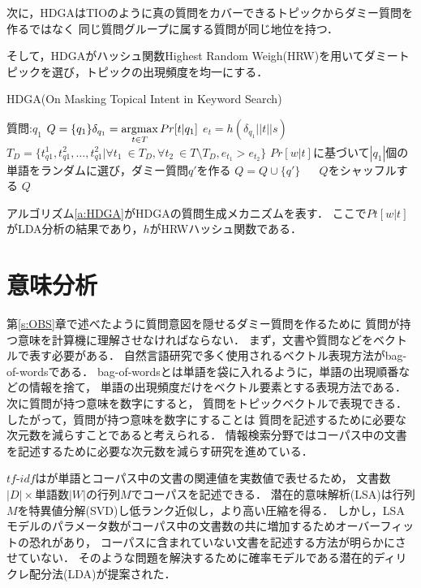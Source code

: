 \documentclass[master]{suribt}
\theoremstyle{definition}
\newcommand{\argmax}{\mathop{\rm argmax}\limits}
\begin{document}
 次に，HDGAはTIOのように真の質問をカバーできるトピックからダミー質問を作るではなく
 同じ質問グループに属する質問が同じ地位を持つ．

 そして，HDGAがハッシュ関数Highest Random Weigh(HRW)\cite{hrw1998}を用いてダミートピックを選び，トピックの出現頻度を均一にする．

 \begin{algorithm}
 \caption{HDGA(On Masking Topical Intent in Keyword Search)}
 \begin{algorithmic}[1]
  \Require 質問:$q_1$
  \State $Q = \{q_1\}\delta_{q_1} = \argmax_{t \in T} Pr[t|q_1]$
  \State $e_t = h(\delta_{q_1}||t||s)$
  \EndFor
  \State $T_D = \{t^1_{q1},t^2_{q1}, \dots , t^2_{q1} | \forall t_1 \ \in T_D , \forall t_2 \ \in T \setminus T_D, e_{t_1} > e_{t_2} \}$
  \While { $ \argmax_{t \in T} Pr[t|q'] \neq t$}
  \State $Pr[w|t]$に基づいて$|q_1|$個の単語をランダムに選び，ダミー質問$q'$を作る
  \EndWhile
  \State $Q = Q \cup \{q'\}$
  \EndFor　
  \State $Q$をシャッフルする
  \Ensure $Q$
 \end{algorithmic}
 \label{a:HDGA}
 \end{algorithm}

 アルゴリズム\ref{a:HDGA}がHDGAの質問生成メカニズムを表す．
 ここで$Pt[w|t]$がLDA分析の結果であり，$h$がHRWハッシュ関数である．

 \chapter{意味分析} \label{s:sm}
 第\ref{s:OBS}章で述べたように質問意図を隠せるダミー質問を作るために
 質問が持つ意味を計算機に理解させなければならない．
 まず，文書や質問などをベクトルで表す必要がある．
 自然言語研究で多く使用されるベクトル表現方法がbag-of-wordsである．
 bag-of-wordsとは単語を袋に入れるように，単語の出現順番などの情報を捨て，
 単語の出現頻度だけをベクトル要素とする表現方法である．
 次に質問が持つ意味を数字にすると，
 質問をトピックベクトルで表現できる．
 したがって，質問が持つ意味を数字にすることは
 質問を記述するために必要な次元数を減らすことであると考えられる．
 情報検索分野ではコーパス中の文書を記述するために必要な次元数を減らす研究を進めている．

 $tf\text{-}idf$はが単語とコーパス中の文書の関連値を実数値で表せるため，
 文書数$|D| \times$単語数$|W|$の行列$M$でコーパスを記述できる．
 潜在的意味解析(LSA)は行列$M$を特異値分解(SVD)し低ランク近似し，より高い圧縮を得る．
 しかし，LSAモデルのパラメータ数がコーパス中の文書数の共に増加するためオーバーフィットの恐れがあり，
 コーパスに含まれていない文書を記述する方法が明らかにさせていない．
 そのような問題を解決するために確率モデルである潜在的ディリクレ配分法(LDA)が提案された．
\end{document}
